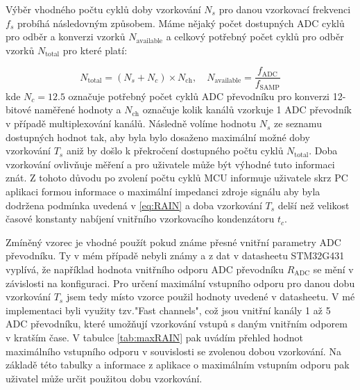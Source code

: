 Výběr vhodného počtu cyklů doby vzorkování $N_s$ pro danou vzorkovací frekvenci $f_s$ probíhá následovným způsobem. Máme nějaký počet dostupných ADC cyklů pro odběr a konverzi vzorků $N_{\text{available}}$ a  celkový potřebný počet cyklů pro odběr vzorků $N_{\text{total}}$ pro které platí:
	
\begin{equation}
N_{\text{total}}=(N_s+N_c)\times N_{\text{ch}}, \quad N_{\text{available}}=\frac{f_\text{ADC}}{f_{\text{SAMP}}}
\end{equation}
kde $N_c=12.5$ označuje potřebný počet cyklů ADC převodníku pro konverzi 12-bitové naměřené hodnoty a $N_{\text{ch}}$ označuje kolik kanálů vzorkuje 1 ADC převodník v případě multiplexování kanálů. Následně volíme hodnotu $N_s$ ze seznamu dostupných hodnot tak, aby byla bylo dosaženo maximální možné doby vzorkování $T_s$ aniž by došlo k překročení dostupného počtu cyklů $N_{\text{total}}$. Doba vzorkování ovlivňuje měření a pro uživatele může být výhodné tuto informaci znát. Z tohoto důvodu po zvolení počtu cyklů MCU informuje uživatele skrz PC aplikaci formou informace o maximální impedanci zdroje signálu aby byla dodržena podmínka uvedená v \ref{eq:RAIN} a doba vzorkování $T_s$ delší než velikost časové konstanty nabíjení vnitřního vzorkovacího kondenzátoru $t_c$.

Zmíněný vzorec je vhodné použít pokud známe přesné vnitřní parametry ADC převodníku. Ty v mém případě nebyli známy a z dat v datasheetu STM32G431 vyplívá, že například hodnota vnitřního odporu ADC převodníku $R_{\text{ADC}}$ se mění v závislosti na konfiguraci. Pro určení maximální vstupního odporu pro danou dobu vzorkování $T_s$ jsem tedy místo vzorce použil hodnoty uvedené v datasheetu\cite{dataG431}. V mé implementaci byli využity tzv."Fast channels", což jsou vnitřní kanály 1 až 5 ADC převodníku, které umožňují vzorkování vstupů s daným vnitřním odporem v kratším čase. V tabulce \ref{tab:maxRAIN} pak uvádím přehled hodnot maximálního vstupního odporu v souvislosti se zvolenou dobou vzorkování. Na základě této tabulky a informace z aplikace o maximálním vstupním odporu pak uživatel může určit použitou dobu vzorkování.\\

